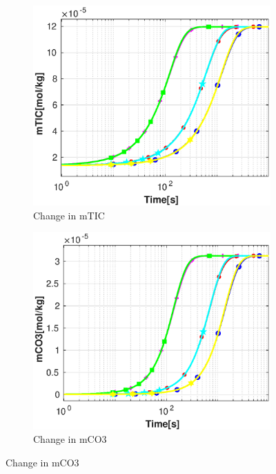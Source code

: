 \begin{figure}
    \hfill
    \begin{subfigure}{.5\linewidth}
            \centering
        \includegraphics[width=\textwidth]{PICTURES/dvm_pH8_mTIC.eps}
        \caption{Change in mTIC}
        \label{fig:dvmpH8mTIC}
    \end{subfigure}%
    \hfill
    \begin{subfigure}{.5\linewidth}
            \centering
        \includegraphics[width=\textwidth]{PICTURES/dvm_pH8_mCO3.eps}
        \caption{Change in mCO3}
        \label{fig:dvmpH8mCO3}

\end{subfigure}
\end{figure}
